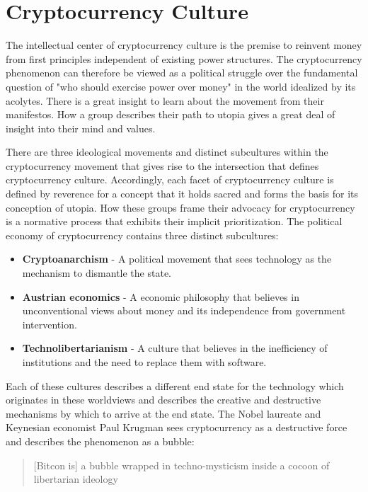 \chapter{Cryptocurrency Culture}

The intellectual center of cryptocurrency culture is the premise to reinvent
money from first principles independent of existing power structures. The
cryptocurrency phenomenon can therefore be viewed as a political struggle over
the fundamental question of "who should exercise power over money" in the world
idealized by its acolytes. There is a great insight to learn about the movement
from their manifestos. How a group describes their path to utopia gives a great
deal of insight into their mind and values.

There are three ideological movements and distinct subcultures within the
cryptocurrency movement that gives rise to the intersection that defines
cryptocurrency culture. Accordingly, each facet of cryptocurrency culture is
defined by reverence for a concept that it holds sacred and forms the basis for
its conception of utopia. How these groups frame their advocacy for
cryptocurrency is a normative process that exhibits their implicit
prioritization. The political economy of cryptocurrency contains three distinct
subcultures:

\begin{itemize}
\tightlist
\item
  \textbf{Cryptoanarchism} - A political movement that sees technology as the
    mechanism to dismantle the state.
\item
  \textbf{Austrian economics} - A economic philosophy that believes in
    unconventional views about money and its independence from government
    intervention.
\item
  \textbf{Technolibertarianism} - A culture that believes in the inefficiency of
    institutions and the need to replace them with software.
\end{itemize}

Each of these cultures describes a different end state for the technology which
originates in these worldviews and describes the creative and destructive
mechanisms by which to arrive at the end state. The Nobel laureate and Keynesian
economist Paul Krugman sees cryptocurrency as a destructive force and describes
\cite{krugman2018derp; @paul2018bitcoin; @krugman2018transaction} the phenomenon as
a bubble:

\begin{quote}
[Bitcon is] a bubble wrapped in techno-mysticism inside a cocoon of libertarian ideology
\end{quote}

